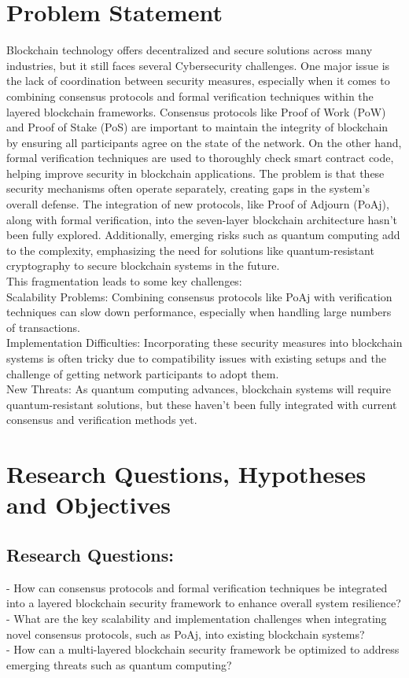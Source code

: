 \documentclass[a4paper, 12pt]{article}
\begin{document}
\section{Problem Statement}
Blockchain technology offers decentralized and secure solutions across many industries, but it still faces several Cybersecurity challenges. One major issue is the lack of coordination between security measures, especially when it comes to combining consensus protocols and formal verification techniques within the layered blockchain frameworks. Consensus protocols like Proof of Work (PoW) and Proof of Stake (PoS) are important to maintain the integrity of blockchain by ensuring all participants agree on the state of the network. On the other hand, formal verification techniques are used to thoroughly check smart contract code, helping improve security in blockchain applications.
The problem is that these security mechanisms often operate separately, creating gaps in the system’s overall defense. The integration of new protocols, like Proof of Adjourn (PoAj), along with formal verification, into the seven-layer blockchain architecture hasn’t been fully explored. Additionally, emerging risks such as quantum computing add to the complexity, emphasizing the need for solutions like quantum-resistant cryptography to secure blockchain systems in the future. \\
This fragmentation leads to some key challenges:
\\
Scalability Problems: Combining consensus protocols like PoAj with verification techniques can slow down performance, especially when handling large numbers of transactions. 
\\
Implementation Difficulties: Incorporating these security measures into blockchain systems is often tricky due to compatibility issues with existing setups and the challenge of getting network participants to adopt them.
\\
New Threats: As quantum computing advances, blockchain systems will require quantum-resistant solutions, but these haven't been fully integrated with current consensus and verification methods yet.

\section{Research Questions, Hypotheses and Objectives}
\subsection{Research Questions:}
- How can consensus protocols and formal verification techniques be integrated into a layered blockchain security framework to enhance overall system resilience?
\\
- What are the key scalability and implementation challenges when integrating novel consensus protocols, such as PoAj, into existing blockchain systems?
\\
- How can a multi-layered blockchain security framework be optimized to address emerging threats such as quantum computing?
\end{document}

